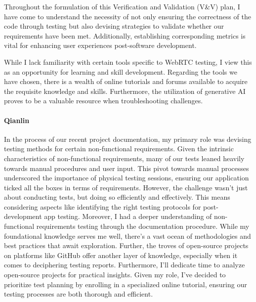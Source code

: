 \documentclass[12pt, titlepage]{article}
\begin{document}
Throughout the formulation of this Verification and Validation (V\&V) plan, I
have come to understand the necessity of not only ensuring the correctness of
the code through testing but also devising strategies to validate whether our
requirements have been met. Additionally, establishing corresponding metrics is
vital for enhancing user experiences post-software development.

While I lack familiarity with certain tools specific to WebRTC testing, I view
this as an opportunity for learning and skill development. Regarding the tools
we have chosen, there is a wealth of online tutorials and forums available to
acquire the requisite knowledge and skills. Furthermore, the utilization of
generative AI proves to be a valuable resource when troubleshooting challenges.

\paragraph*{Qianlin}

In the process of our recent project documentation, my primary role was devising
testing methods for certain non-functional requirements. Given the intrinsic
characteristics of non-functional requirements, many of our tests leaned heavily
towards manual procedures and user input. This pivot towards manual processes
underscored the importance of physical testing sessions, ensuring our
application ticked all the boxes in terms of requirements. However, the
challenge wasn't just about conducting tests, but doing so efficiently and
effectively. This means considering aspects like identifying the right testing
protocols for post-development app testing. Moreover, I had a deeper
understanding of non-functional requirements testing through the documentation
procedure. While my foundational knowledge serves me well, there's a vast ocean
of methodologies and best practices that await exploration. Further, the troves
of open-source projects on platforms like GitHub offer another layer of
knowledge, especially when it comes to deciphering testing reports. Furthermore,
I'll dedicate time to analyze open-source projects for practical insights. Given
my role, I've decided to prioritize test planning by enrolling in a specialized
online tutorial, ensuring our testing processes are both thorough and efficient.
\end{document}
